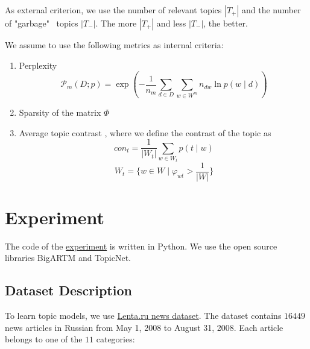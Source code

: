 \documentclass{article}
\begin{document}
As external criterion, we use the number of relevant topics $|T_+|$ and the number of "garbage" \ topics $|T_-|$.
The more $|T_+|$ and less $|T_-|$, the better.

We assume to use the following metrics as internal criteria:

\begin{enumerate}
    \item Perplexity \citep{bigartm}
    \begin{equation}
        \mathcal{P}_m (D; p) = \exp \left( - \frac{1}{n_m} \sum \limits_{d \in D} \sum \limits_{w \in W^m} n_{dw} \ln p (w \mid d) \right)
    \end{equation}
    \item Sparsity of the matrix $\Phi$
    \item Average topic contrast \citep{bigartm}, where we define the contrast of the topic as
    \begin{equation}
        {con}_t = \frac{1}{|W_t|} \sum \limits_{w \in W_t} p(t \mid w)
    \end{equation}
    \begin{equation}
        W_t = \{ w \in W \mid \varphi_{wt} > \frac{1}{|W|} \}
    \end{equation}
\end{enumerate}

\section{Experiment}

The code of the \href{https://github.com/intsystems/2023-Project-131/blob/master/code/Experiment_Tuning_Last.ipynb}{experiment} is written in Python. We use the open source libraries BigARTM and TopicNet.

\subsection{Dataset Description}

To learn topic models, we use \href{https://disk.yandex.ru/d/DAdhmVB2eFkdBQ}{Lenta.ru news dataset}.
The dataset contains $16 449$ news articles in Russian from May 1, 2008 to August 31, 2008.
Each article belongs to one of the $11$ categories:
\end{document}
